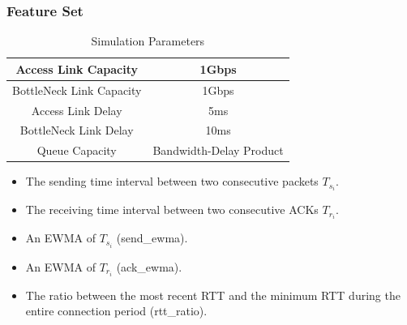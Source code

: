 \documentclass{beamer}
\begin{document}
\begin{frame}
\frametitle{Feature Set}
\begin{table}
\begin{center}
\caption {Simulation Parameters} \label{tab:simuPara}
\begin{tabular}{ |c|c| }
 \hline
 Access Link Capacity & 1Gbps  \\
 \hline
 BottleNeck Link Capacity & 1Gbps  \\
 \hline
 Access Link Delay & 5ms  \\
 \hline
 BottleNeck Link Delay & 10ms\\
 \hline
 Queue Capacity & Bandwidth-Delay Product\\
 \hline
\end{tabular}
\end{center}
\end{table}
\begin{itemize}
\item The sending time interval between two consecutive packets $T_{s_{i}}$.
\item The receiving time interval between two consecutive ACKs $T_{r_{i}}$.
\item An EWMA of $T_{s_{i}}$ (send\_ewma).
\item An EWMA of $T_{r_{i}}$ (ack\_ewma).
\item The ratio between the most recent RTT and the minimum RTT during the entire connection period (rtt\_ratio).
\end{itemize}

\end{frame}
\end{document}
